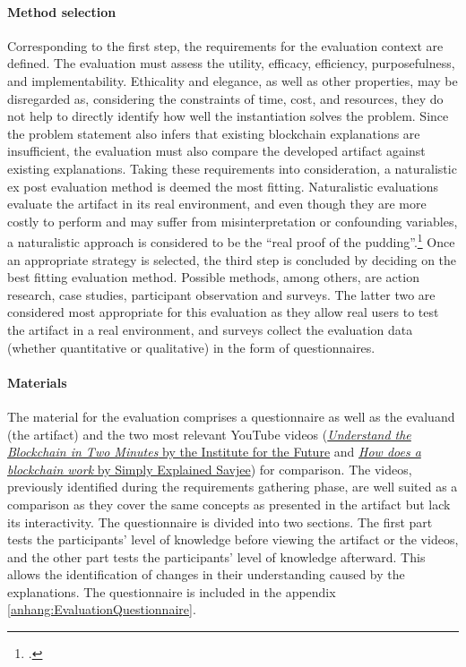\paragraph{Method selection} Corresponding to the first step, the requirements for the evaluation context are defined. The evaluation must assess the utility, efficacy, efficiency, purposefulness, and implementability. Ethicality and elegance, as well as other properties, may be disregarded as, considering the constraints of time, cost, and resources, they do not help to directly identify how well the instantiation solves the problem. Since the problem statement also infers that existing blockchain explanations are insufficient, the evaluation must also compare the developed artifact against existing explanations. Taking these requirements into consideration, a naturalistic ex post evaluation method is deemed the most fitting. Naturalistic evaluations evaluate the artifact in its real environment, and even though they are more costly to perform and may suffer from misinterpretation or confounding variables, a naturalistic approach is considered to be the \enquote{real proof of the pudding}.\footcites[Cf.][p.3 et seqq]{Pries-HejeStrategiesDesignScience}[cf.][p.80]{PfeffersDesignScienceResearch2012} Once an appropriate strategy is selected, the third step is concluded by deciding on the best fitting evaluation method. Possible methods, among others, are action research, case studies, participant observation and surveys. The latter two are considered most appropriate for this evaluation as they allow real users to test the artifact in a real environment, and surveys collect the evaluation data (whether quantitative or qualitative) in the form of questionnaires. 

\paragraph{Materials} The material for the evaluation comprises a questionnaire as well as the evaluand (the artifact) and the two most relevant YouTube videos (\href{https://www.youtube.com/watch?v=r43LhSUUGTQ}{\textit{Understand the Blockchain in Two Minutes} by the Institute for the Future} and \href{https://www.youtube.com/watch?v=SSo_EIwHSd4}{\textit{How does a blockchain work} by Simply Explained Savjee}) for comparison. The videos, previously identified during the requirements gathering phase, are well suited as a comparison as they cover the same concepts as presented in the artifact but lack its interactivity. The questionnaire is divided into two sections. The first part tests the participants' level of knowledge before viewing the artifact or the videos, and the other part tests the participants' level of knowledge afterward. This allows the identification of changes in their understanding caused by the explanations. The questionnaire is included in the appendix \ref{anhang:EvaluationQuestionnaire}. 

